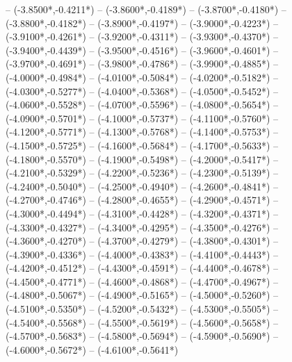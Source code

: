 {	-- ({-3.8500*\dx},{-0.4211*\dy})
	-- ({-3.8600*\dx},{-0.4189*\dy})
	-- ({-3.8700*\dx},{-0.4180*\dy})
	-- ({-3.8800*\dx},{-0.4182*\dy})
	-- ({-3.8900*\dx},{-0.4197*\dy})
	-- ({-3.9000*\dx},{-0.4223*\dy})
	-- ({-3.9100*\dx},{-0.4261*\dy})
	-- ({-3.9200*\dx},{-0.4311*\dy})
	-- ({-3.9300*\dx},{-0.4370*\dy})
	-- ({-3.9400*\dx},{-0.4439*\dy})
	-- ({-3.9500*\dx},{-0.4516*\dy})
	-- ({-3.9600*\dx},{-0.4601*\dy})
	-- ({-3.9700*\dx},{-0.4691*\dy})
	-- ({-3.9800*\dx},{-0.4786*\dy})
	-- ({-3.9900*\dx},{-0.4885*\dy})
	-- ({-4.0000*\dx},{-0.4984*\dy})
	-- ({-4.0100*\dx},{-0.5084*\dy})
	-- ({-4.0200*\dx},{-0.5182*\dy})
	-- ({-4.0300*\dx},{-0.5277*\dy})
	-- ({-4.0400*\dx},{-0.5368*\dy})
	-- ({-4.0500*\dx},{-0.5452*\dy})
	-- ({-4.0600*\dx},{-0.5528*\dy})
	-- ({-4.0700*\dx},{-0.5596*\dy})
	-- ({-4.0800*\dx},{-0.5654*\dy})
	-- ({-4.0900*\dx},{-0.5701*\dy})
	-- ({-4.1000*\dx},{-0.5737*\dy})
	-- ({-4.1100*\dx},{-0.5760*\dy})
	-- ({-4.1200*\dx},{-0.5771*\dy})
	-- ({-4.1300*\dx},{-0.5768*\dy})
	-- ({-4.1400*\dx},{-0.5753*\dy})
	-- ({-4.1500*\dx},{-0.5725*\dy})
	-- ({-4.1600*\dx},{-0.5684*\dy})
	-- ({-4.1700*\dx},{-0.5633*\dy})
	-- ({-4.1800*\dx},{-0.5570*\dy})
	-- ({-4.1900*\dx},{-0.5498*\dy})
	-- ({-4.2000*\dx},{-0.5417*\dy})
	-- ({-4.2100*\dx},{-0.5329*\dy})
	-- ({-4.2200*\dx},{-0.5236*\dy})
	-- ({-4.2300*\dx},{-0.5139*\dy})
	-- ({-4.2400*\dx},{-0.5040*\dy})
	-- ({-4.2500*\dx},{-0.4940*\dy})
	-- ({-4.2600*\dx},{-0.4841*\dy})
	-- ({-4.2700*\dx},{-0.4746*\dy})
	-- ({-4.2800*\dx},{-0.4655*\dy})
	-- ({-4.2900*\dx},{-0.4571*\dy})
	-- ({-4.3000*\dx},{-0.4494*\dy})
	-- ({-4.3100*\dx},{-0.4428*\dy})
	-- ({-4.3200*\dx},{-0.4371*\dy})
	-- ({-4.3300*\dx},{-0.4327*\dy})
	-- ({-4.3400*\dx},{-0.4295*\dy})
	-- ({-4.3500*\dx},{-0.4276*\dy})
	-- ({-4.3600*\dx},{-0.4270*\dy})
	-- ({-4.3700*\dx},{-0.4279*\dy})
	-- ({-4.3800*\dx},{-0.4301*\dy})
	-- ({-4.3900*\dx},{-0.4336*\dy})
	-- ({-4.4000*\dx},{-0.4383*\dy})
	-- ({-4.4100*\dx},{-0.4443*\dy})
	-- ({-4.4200*\dx},{-0.4512*\dy})
	-- ({-4.4300*\dx},{-0.4591*\dy})
	-- ({-4.4400*\dx},{-0.4678*\dy})
	-- ({-4.4500*\dx},{-0.4771*\dy})
	-- ({-4.4600*\dx},{-0.4868*\dy})
	-- ({-4.4700*\dx},{-0.4967*\dy})
	-- ({-4.4800*\dx},{-0.5067*\dy})
	-- ({-4.4900*\dx},{-0.5165*\dy})
	-- ({-4.5000*\dx},{-0.5260*\dy})
	-- ({-4.5100*\dx},{-0.5350*\dy})
	-- ({-4.5200*\dx},{-0.5432*\dy})
	-- ({-4.5300*\dx},{-0.5505*\dy})
	-- ({-4.5400*\dx},{-0.5568*\dy})
	-- ({-4.5500*\dx},{-0.5619*\dy})
	-- ({-4.5600*\dx},{-0.5658*\dy})
	-- ({-4.5700*\dx},{-0.5683*\dy})
	-- ({-4.5800*\dx},{-0.5694*\dy})
	-- ({-4.5900*\dx},{-0.5690*\dy})
	-- ({-4.6000*\dx},{-0.5672*\dy})
	-- ({-4.6100*\dx},{-0.5641*\dy})
}
